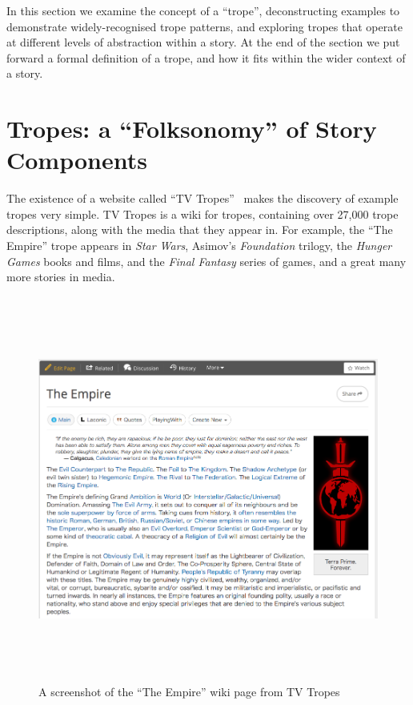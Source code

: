 \documentclass[11pt]{report}
\begin{document}

In this section we examine the concept of a ``trope'', deconstructing examples
to demonstrate widely-recognised trope patterns, and exploring tropes that
operate at different levels of abstraction within a story. At the end of the
section we put forward a formal definition of a trope, and how it fits within the
wider context of a story.

\section{Tropes: a ``Folksonomy'' of Story Components}
The existence of a website called ``TV Tropes''~\citep{tvtropes} makes the discovery of example
tropes very simple. TV Tropes is a wiki for tropes, containing over 27,000
trope descriptions, along with the media that they appear in. For example, the
``The Empire'' trope appears in \emph{Star Wars}, Asimov's \emph{Foundation}
trilogy, the \emph{Hunger Games} books and films, and the \emph{Final Fantasy}
series of games, and a great many more stories in media.


\begin{figure}[!t]
\centerline{\includegraphics[height=5in]{evilEmpire.png}}
\caption{A screenshot of the ``The Empire'' wiki page from TV Tropes} \label{fig:evil-empire}
\end{figure}
\end{document}
